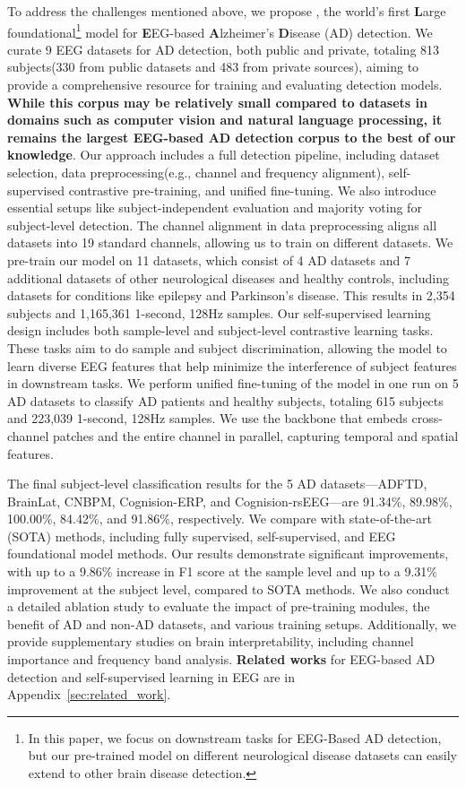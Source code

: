 To address the challenges mentioned above, we propose \name, the world’s first \textbf{L}arge foundational\footnote{In this paper, we focus on downstream tasks for EEG-Based AD detection, but our pre-trained model on different neurological disease datasets can easily extend to other brain disease detection.} model for \textbf{E}EG-based \textbf{A}lzheimer’s \textbf{D}isease (AD) detection. We curate 9 EEG datasets for AD detection, both public and private, totaling 813 subjects(330 from public datasets and 483 from private sources), aiming to provide a comprehensive resource for training and evaluating detection models. \textbf{While this corpus may be relatively small compared to datasets in domains such as computer vision and natural language processing, it remains the largest EEG-based AD detection corpus to the best of our knowledge}. Our approach includes a full detection pipeline, including dataset selection, data preprocessing(e.g., channel and frequency alignment), self-supervised contrastive pre-training, and unified fine-tuning. We also introduce essential setups like subject-independent evaluation and majority voting for subject-level detection. The channel alignment in data preprocessing aligns all datasets into 19 standard channels, allowing us to train on different datasets. We pre-train our model on 11 datasets, which consist of 4 AD datasets and 7 additional datasets of other neurological diseases and healthy controls, including datasets for conditions like epilepsy and Parkinson's disease. This results in 2,354 subjects and 1,165,361 1-second, 128Hz samples. Our self-supervised learning design includes both sample-level and subject-level contrastive learning tasks. These tasks aim to do sample and subject discrimination, allowing the model to learn diverse EEG features that help minimize the interference of subject features in downstream tasks. We perform unified fine-tuning of the model in one run on 5 AD datasets to classify AD patients and healthy subjects, totaling 615 subjects and 223,039 1-second, 128Hz samples. We use the backbone that embeds cross-channel patches and the entire channel in parallel, capturing temporal and spatial features.

The final subject-level classification results for the 5 AD datasets—ADFTD, BrainLat, CNBPM, Cognision-ERP, and Cognision-rsEEG—are 91.34\%, 89.98\%, 100.00\%, 84.42\%, and 91.86\%, respectively. We compare \name with state-of-the-art (SOTA) methods, including fully supervised, self-supervised, and EEG foundational model methods. Our results demonstrate significant improvements, with up to a 9.86\% increase in F1 score at the sample level and up to a 9.31\% improvement at the subject level, compared to SOTA methods. We also conduct a detailed ablation study to evaluate the impact of pre-training modules, the benefit of AD and non-AD datasets, and various training setups. Additionally, we provide supplementary studies on brain interpretability, including channel importance and frequency band analysis. \textbf{Related works} for EEG-based AD detection and self-supervised learning in EEG are in Appendix~\ref{sec:related_work}.




